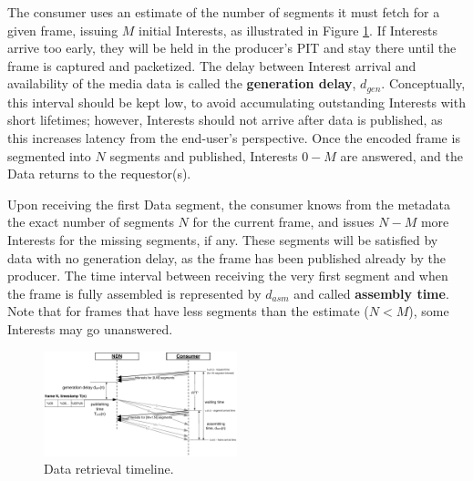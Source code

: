 \documentclass{icn/sig-alternate-2013} %
\begin{document}
The consumer uses an estimate of the number of segments it must fetch for a given frame, issuing $M$ initial Interests, as illustrated in Figure \ref{fig:pull}. If Interests arrive too early, they will be held in the producer's PIT and stay there until the frame is captured and packetized. The delay between Interest arrival and availability of the media data is called the \textbf{generation delay}, $d_{gen}$. Conceptually, this interval should be kept low, to avoid accumulating outstanding Interests with short lifetimes; however,  Interests should not arrive after data is published, as this increases latency from the end-user's perspective.  Once the encoded frame is segmented into $N$ segments and published, Interests $0 - M$ are answered, and the Data returns to the requestor(s). 

Upon receiving the first Data segment, the consumer knows from the metadata the exact number of segments $N$ for the current frame, and issues $N - M$ more Interests for the missing segments, if any. These segments will be satisfied by data with no generation delay, as the frame has been published already by the producer. The time interval between receiving the very first segment and when the frame is fully assembled is represented by $d_{asm}$ and called \textbf{assembly time}. Note that for frames that have less segments than the estimate ($N < M$), some Interests may go unanswered.%
 

\begin{figure}[t!]
\centering
\includegraphics[width=0.5\textwidth]{frame-fetch}
\vspace{-18pt}
\caption{Data retrieval timeline.}
\label{fig:pull}
\end{figure}
\end{document}
